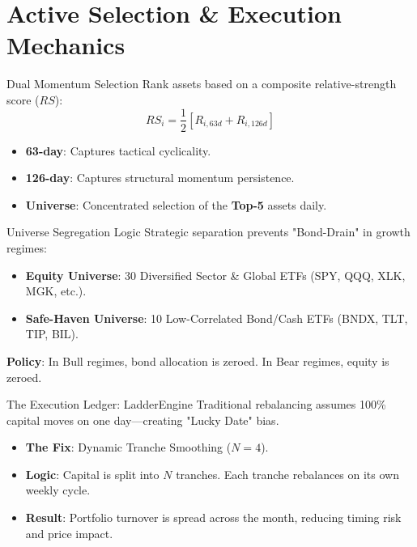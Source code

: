\documentclass[10pt]{beamer}
\begin{document}
\section{Active Selection \& Execution Mechanics}

\begin{frame}{Dual Momentum Selection}
    Rank assets based on a composite relative-strength score ($RS$):
    \vspace{0.5cm}
    \[ RS_i = \frac{1}{2} \left[ R_{i, 63d} + R_{i, 126d} \right] \]
    \vspace{0.3cm}
    \begin{itemize}
        \item \textbf{63-day}: Captures tactical cyclicality.
        \item \textbf{126-day}: Captures structural momentum persistence.
        \item \textbf{Universe}: Concentrated selection of the \textbf{Top-5} assets daily.
    \end{itemize}
\end{frame}

\begin{frame}{Universe Segregation Logic}
    Strategic separation prevents "Bond-Drain" in growth regimes:
    \vspace{0.3cm}
    \begin{itemize}
        \item \textbf{Equity Universe}: 30 Diversified Sector \& Global ETFs (SPY, QQQ, XLK, MGK, etc.).
        \item \textbf{Safe-Haven Universe}: 10 Low-Correlated Bond/Cash ETFs (BNDX, TLT, TIP, BIL).
    \end{itemize}
    \vspace{0.3cm}
    \textbf{Policy}: In Bull regimes, bond allocation is zeroed. In Bear regimes, equity is zeroed.
\end{frame}

\begin{frame}{The Execution Ledger: LadderEngine}
    Traditional rebalancing assumes 100\% capital moves on one day—creating "Lucky Date" bias.
    \vspace{0.3cm}
    \begin{itemize}
        \item \textbf{The Fix}: Dynamic Tranche Smoothing ($N=4$).
        \item \textbf{Logic}: Capital is split into $N$ tranches. Each tranche rebalances on its own weekly cycle.
        \item \textbf{Result}: Portfolio turnover is spread across the month, reducing timing risk and price impact.
    \end{itemize}
\end{frame}
\end{document}
